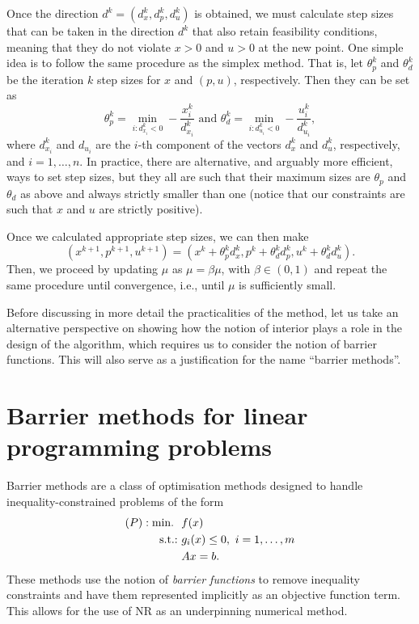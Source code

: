 Once the direction $d^k = (d_x^k, d_p^k, d_u^k)$ is obtained, we must calculate step sizes that can be taken in the direction $d^k$ that also retain feasibility conditions, meaning that they do not violate $x >0$ and $u > 0$ at the new point. One simple idea is to follow the same procedure as the simplex method. That is, let $\theta_p^k$ and $\theta_d^k$ be the iteration $k$ step sizes for $x$ and $(p,u)$, respectively. Then they can be set as
	\begin{equation*}
		\theta_p^k = \min_{i:d_{x_i}^k < 0} - \frac{x_i^k}{d_{x_i}^k} \text{ and }	\theta_d^k = \min_{i:d_{u_i}^k < 0} - \frac{u_i^k}{d_{u_i}^k},
	\end{equation*}
		where $d_{x_i}^k$ and $d_{u_i}$ are the $i$-th component of the vectors $d_x^k$ and $d_u^k$, respectively, and $i = 1, \dots, n$. In practice, there are alternative, and arguably more efficient, ways to set step sizes, but they all are such that their maximum sizes are $\theta_p$ and $\theta_d$ as above and always strictly smaller than one (notice that our constraints are such that $x$ and $u$ are strictly positive).
		
		Once we calculated appropriate step sizes, we can then make 
		$$
		(x^{k+1}, p^{k+1}, u^{k+1}) = (x^{k} + \theta_{p}^kd_x^k, p^{k} + \theta_d^k d_p^{k}, u^{k} + \theta_d^k d_u^k).
	$$
	Then, we proceed by updating $\mu$ as $\mu = \beta \mu$, with $\beta \in (0,1)$ and repeat the same procedure until convergence, i.e., until $\mu$ is sufficiently small.  
		
Before discussing in more detail the practicalities of the method, let us take an alternative perspective on showing how the notion of interior plays a role in the design of the algorithm, which requires us to consider the notion of barrier functions. This will also serve as a justification for the name ``barrier methods''. 
	
	
\section{Barrier methods for linear programming problems}


Barrier methods are a class of optimisation methods designed to handle inequality-constrained problems of the form
	\begin{align*}
	(P) : \mathop{\text{min.~}} \ & f(x) \\
	\mathop{\text{s.t.:~}} & g_i(x) \leq 0, \ i = 1,\dots,m \\
	& Ax = b. 
	\end{align*}
	These methods use the notion of \emph{barrier functions} to remove inequality constraints and have them represented implicitly as an objective function term. This allows for the use of NR as an underpinning numerical method. 
	
